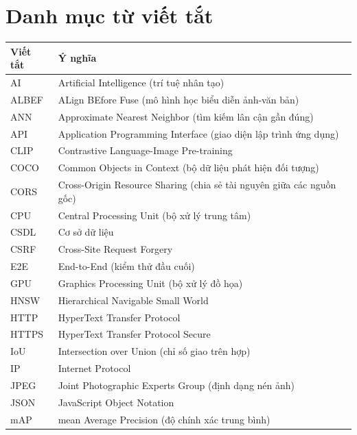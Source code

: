 \chapter*{Danh mục từ viết tắt}

\begin{longtable}{|p{3cm}|p{11cm}|}
\hline
\textbf{Viết tắt} & \textbf{Ý nghĩa} \\
\hline
\endhead
AI & Artificial Intelligence (trí tuệ nhân tạo) \\
\hline
ALBEF & ALign BEfore Fuse (mô hình học biểu diễn ảnh-văn bản) \\
\hline
ANN & Approximate Nearest Neighbor (tìm kiếm lân cận gần đúng) \\
\hline
API & Application Programming Interface (giao diện lập trình ứng dụng) \\
\hline
CLIP & Contrastive Language-Image Pre-training \\
\hline
COCO & Common Objects in Context (bộ dữ liệu phát hiện đối tượng) \\
\hline
CORS & Cross-Origin Resource Sharing (chia sẻ tài nguyên giữa các nguồn gốc) \\
\hline
CPU & Central Processing Unit (bộ xử lý trung tâm) \\
\hline
CSDL & Cơ sở dữ liệu \\
\hline
CSRF & Cross-Site Request Forgery \\
\hline
E2E & End-to-End (kiểm thử đầu cuối) \\
\hline
GPU & Graphics Processing Unit (bộ xử lý đồ họa) \\
\hline
HNSW & Hierarchical Navigable Small World \\
\hline
HTTP & HyperText Transfer Protocol \\
\hline
HTTPS & HyperText Transfer Protocol Secure \\
\hline
IoU & Intersection over Union (chỉ số giao trên hợp) \\
\hline
IP & Internet Protocol \\
\hline
JPEG & Joint Photographic Experts Group (định dạng nén ảnh) \\
\hline
JSON & JavaScript Object Notation \\
\hline
mAP & mean Average Precision (độ chính xác trung bình) \\

\end{longtable}
